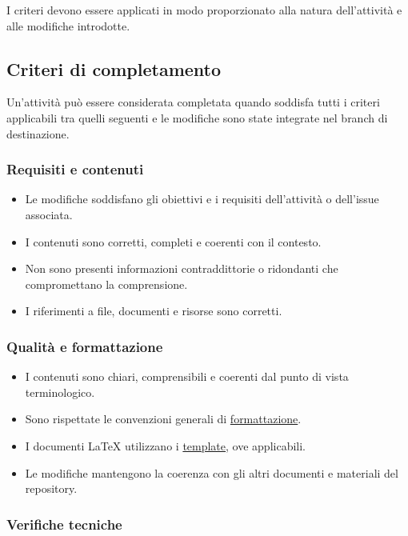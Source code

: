 \documentclass[11pt, a4paper]{article}
\begin{document}
\noindent I criteri devono essere applicati in modo proporzionato alla natura dell'attività e alle modifiche introdotte.

\subsection{Criteri di completamento}

Un'attività può essere considerata completata quando soddisfa tutti i criteri applicabili tra quelli seguenti e le modifiche sono state integrate nel branch di destinazione.

\subsubsection{Requisiti e contenuti}

\begin{itemize}
    \item Le modifiche soddisfano gli obiettivi e i requisiti dell'attività o dell'issue associata.
    \item I contenuti sono corretti, completi e coerenti con il contesto.
    \item Non sono presenti informazioni contraddittorie o ridondanti che compromettano la comprensione.
    \item I riferimenti a file, documenti e risorse sono corretti.
\end{itemize}

\subsubsection{Qualità e formattazione}

\begin{itemize}
    \item I contenuti sono chiari, comprensibili e coerenti dal punto di vista terminologico.
    \item Sono rispettate le convenzioni generali di \hyperref[subsec:formattazione-del-testo]{formattazione}.
    \item I documenti LaTeX utilizzano i \href{https://github.com/On-By-One-Team/On-By-One.github.io/blob/main/docs/tex/templates}{template}, ove applicabili.
    \item Le modifiche mantengono la coerenza con gli altri documenti e materiali del repository.
\end{itemize}

\subsubsection{Verifiche tecniche}
\end{document}
